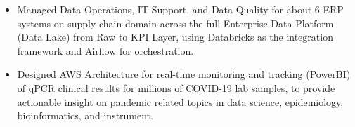\documentclass[10pt,a4paper]{altacv}
\begin{document}
\tagline{}

%

\begin{fullwidth}
\makecvheader
\end{fullwidth}

%





\begin{itemize}
    \item   \small{Managed Data Operations, IT Support, and Data Quality for about 6 ERP systems on supply chain domain across the full Enterprise Data Platform (Data Lake) from Raw to KPI Layer, using Databricks as the integration framework and Airflow for orchestration.}
    \item   \small{Designed AWS Architecture for real-time monitoring and tracking (PowerBI) of qPCR clinical results for millions of COVID-19 lab samples, to provide actionable insight on pandemic related topics in data science, epidemiology, bioinformatics, and instrument.}
\end{itemize}

\medskip


\end{document}

